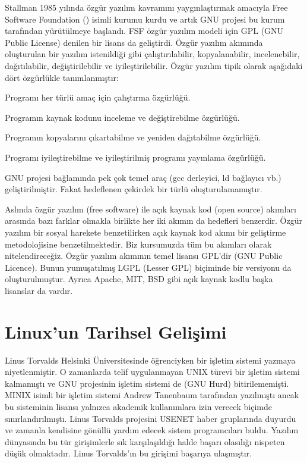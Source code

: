 \documentclass[a4paper,10pt,turkish]{sphinxmanual}
\begin{document}
\sphinxAtStartPar
Stallman 1985 yılında özgür yazılım kavramını yaygınlaştırmak amacıyla Free Software
Foundation () isimli kurumu kurdu ve artık GNU projesi bu kurum
tarafından yürütülmeye başlandı. FSF özgür yazılım modeli için GPL (GNU Public License)
denilen bir lisans da geliştirdi. Özgür yazılım akımında oluşturulan bir yazılım
istenildiği gibi çalıştırılabilir, kopyalanabilir, incelenebilir, dağıtılabilir,
değiştirilebilir ve iyileştirilebilir. Özgür yazılım tipik olarak aşağıdaki dört özgürlükle
tanımlanmıştır:
\begin{description}
\sphinxAtStartPar
Programı her türlü amaç için çalıştırma özgürlüğü.

\sphinxAtStartPar
Programın kaynak kodunu inceleme ve değiştirebilme özgürlüğü.

\sphinxAtStartPar
Programın kopyalarını çıkartabilme ve yeniden dağıtabilme özgürlüğü.

\sphinxAtStartPar
Programı iyileştirebilme ve iyileştirilmiş programı yayınlama özgürlüğü.

\end{description}

\sphinxAtStartPar
GNU projesi bağlamında pek çok temel araç (gcc derleyici, ld bağlayıcı vb.) geliştirilmiştir.
Fakat hedeflenen çekirdek bir türlü oluşturulamamıştır.

\sphinxAtStartPar
Aslında özgür yazılım (free software) ile açık kaynak kod (open source) akımları arasında
bazı farklar olmakla birlikte her iki akımın da hedefleri benzerdir. Özgür yazılım bir
sosyal harekete benzetilirken açık kaynak kod akımı bir geliştirme metodolojisine
benzetilmektedir. Biz kursumuzda tüm bu akımları  olarak
nitelendireceğiz. Özgür yazılım akımının temel lisansı GPL’dir (GNU Public Licence). Bunun
yumuşatılmış LGPL (Lesser GPL) biçiminde bir versiyonu da oluşturulmuştur. Ayrıca Apache,
MIT, BSD gibi açık kaynak kodlu başka lisanslar da vardır.


\section{Linux’un Tarihsel Gelişimi}
\label{\detokenize{introduction:linux-un-tarihsel-gelisimi}}
\sphinxAtStartPar
Linus Torvalds Helsinki Üniversitesinde öğrenciyken bir işletim sistemi yazmaya
niyetlenmiştir. O zamanlarda telif uygulanmayan UNIX türevi bir işletim sistemi kalmamıştı
ve GNU projesinin işletim sistemi de (GNU Hurd) bitirilememişti. MINIX isimli bir işletim
sistemi Andrew Tanenbaum tarafından yazılmıştı ancak bu sisteminin lisansı yalnızca akademik
kullanımlara izin verecek biçimde sınırlandırılmıştı. Linus Torvalds projesini USENET haber
gruplarında duyurdu ve zamanla kendisine gönüllü yardım edecek sistem programcıları buldu.
Yazılım dünyasında bu tür girişimlerle sık karşılaşıldığı halde başarı olasılığı nispeten
düşük olmaktadır. Linus Torvalds’ın bu girişimi başarıya ulaşmıştır.
\end{document}
